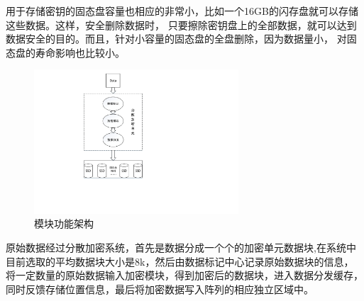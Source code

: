 用于存储密钥的固态盘容量也相应的非常小，比如一个16GB的闪存盘就可以存储这些数据。这样，安全删除数据时，
只要擦除密钥盘上的全部数据，就可以达到数据安全的目的。而且，针对小容量的固态盘的全盘删除，因为数据量小，
对固态盘的寿命影响也比较小。
\begin{figure}[H]
	\centering
	\includegraphics[width=3in]{Pics/total-structure.pdf}
    \caption{模块功能架构}
    \label{fig:4}
\end{figure}
原始数据经过分散加密系统，首先是数据分成一个个的加密单元数据块,在系统中目前选取的平均数据块大小是8k，然后由数据标记中心记录原始数据块的信息，将一定数量的原始数据输入加密模块，得到加密后的数据块，进入数据分发缓存，同时反馈存储位置信息，最后将加密数据写入阵列的相应独立区域中。
